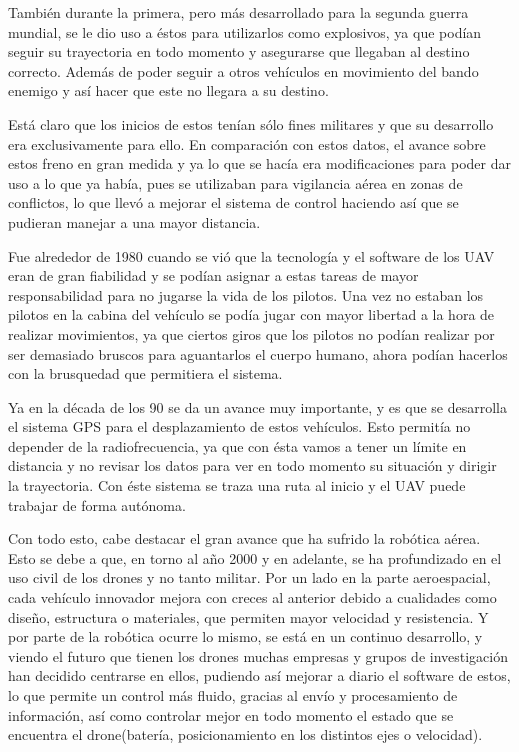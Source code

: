 \hspace{1cm} Tambi\'en durante la primera, pero m\'as desarrollado para la segunda guerra mundial, se le dio uso a \'estos para utilizarlos como explosivos, ya que pod\'ian seguir su trayectoria en todo momento y asegurarse que llegaban al destino correcto. Adem\'as de poder seguir a otros veh\'iculos en movimiento del bando enemigo y as\'i hacer que este no llegara a su destino. 

\hspace{1cm} Est\'a claro que los inicios de estos ten\'ian s\'olo fines militares y que su desarrollo era exclusivamente para ello. En comparaci\'on con estos datos, el avance sobre estos freno en gran medida y ya lo que se hac\'ia era modificaciones para poder dar uso a lo que ya hab\'ia, pues se utilizaban para vigilancia a\'erea en zonas de conflictos, lo que llev\'o a mejorar el sistema de control haciendo as\'i que se pudieran manejar a una mayor distancia. 

\hspace{1 cm}Fue alrededor de 1980 cuando se vi\'o que la tecnolog\'ia y el software de los UAV eran de gran fiabilidad y se pod\'ian asignar a estas tareas de mayor responsabilidad para no jugarse la vida de los pilotos. Una vez no estaban los pilotos en la cabina del veh\'iculo se pod\'ia jugar con mayor libertad a la hora de realizar movimientos, ya que ciertos giros que los pilotos no pod\'ian realizar por ser demasiado bruscos para aguantarlos el cuerpo humano, ahora pod\'ian hacerlos con la brusquedad que permitiera el sistema.  

\hspace{1 cm} Ya en la d\'ecada de los 90 se da un avance muy importante, y es que se desarrolla el sistema GPS para el desplazamiento de estos veh\'iculos. Esto permit\'ia no depender de la radiofrecuencia, ya que con \'esta vamos a tener un l\'imite en distancia y no revisar los datos para ver en todo momento su situaci\'on y dirigir la trayectoria. Con \'este sistema se traza una ruta al inicio y el UAV puede trabajar de forma aut\'onoma. 

\hspace{1cm} Con todo esto, cabe destacar el gran avance que ha sufrido la rob\'otica a\'erea. Esto se debe a que, en torno al año 2000 y en adelante, se ha profundizado en el uso civil de los drones y no tanto militar. Por un lado en la parte aeroespacial, cada veh\'iculo innovador mejora con creces al anterior debido a cualidades como diseño, estructura o materiales, que permiten mayor velocidad y resistencia. Y por parte de la rob\'otica ocurre lo mismo, se est\'a en un continuo desarrollo, y viendo el futuro que tienen los drones muchas empresas y grupos de investigaci\'on han decidido centrarse en ellos, pudiendo as\'i mejorar a diario el software de estos, lo que permite un control m\'as fluido, gracias al env\'io y procesamiento de informaci\'on, as\'i como controlar mejor en todo momento el estado que se encuentra el drone(bater\'ia, posicionamiento en los distintos ejes o velocidad). 
 


